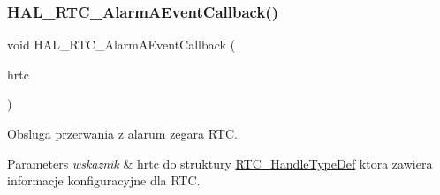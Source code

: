 \subsubsection{\texorpdfstring{H\+A\+L\+\_\+\+R\+T\+C\+\_\+\+Alarm\+A\+Event\+Callback()}{HAL\_RTC\_AlarmAEventCallback()}}
{\footnotesize\ttfamily void H\+A\+L\+\_\+\+R\+T\+C\+\_\+\+Alarm\+A\+Event\+Callback (\begin{DoxyParamCaption}\item[{\hyperlink{struct_r_t_c___handle_type_def}{R\+T\+C\+\_\+\+Handle\+Type\+Def} $\ast$}]{hrtc }\end{DoxyParamCaption})}



Obsluga przerwania z alarum zegara R\+TC. 


\begin{DoxyParams}{Parameters}
{\em wskaznik} & hrtc do struktury \hyperlink{struct_r_t_c___handle_type_def}{R\+T\+C\+\_\+\+Handle\+Type\+Def} ktora zawiera informacje konfiguracyjne dla R\+TC. \\
\hline
\end{DoxyParams}
